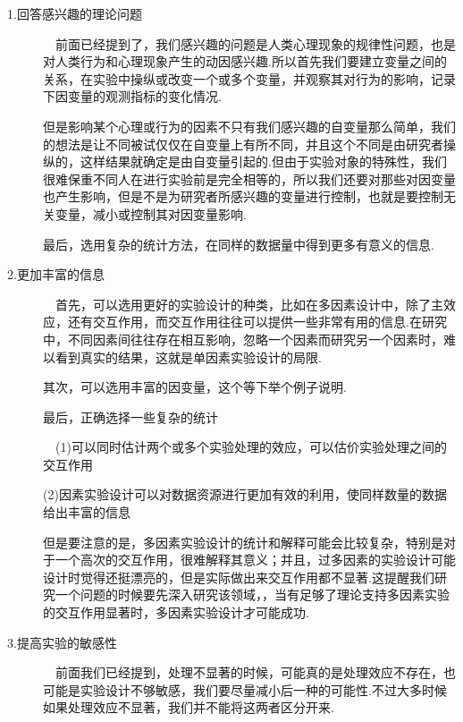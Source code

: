 \begin{description}
	\item[1.回答感兴趣的理论问题] 
	~\
	前面已经提到了，我们感兴趣的问题是人类心理现象的规律性问题，也是对人类行为和心理现象产生的动因感兴趣.所以首先我们要建立变量之间的关系，在实验中操纵或改变一个或多个变量，并观察其对行为的影响，记录下因变量的观测指标的变化情况.
	
	但是影响某个心理或行为的因素不只有我们感兴趣的自变量那么简单，我们的想法是让不同被试仅仅在自变量上有所不同，并且这个不同是由研究者操纵的，这样结果就确定是由自变量引起的.但由于实验对象的特殊性，我们很难保重不同人在进行实验前是完全相等的，所以我们还要对那些对因变量也产生影响，但是不是为研究者所感兴趣的变量进行控制，也就是要控制无关变量，减小或控制其对因变量影响.
	
	最后，选用复杂的统计方法，在同样的数据量中得到更多有意义的信息.
	
	\item[2.更加丰富的信息]
	~\
	首先，可以选用更好的实验设计的种类，比如在多因素设计中，除了主效应，还有交互作用，而交互作用往往可以提供一些非常有用的信息.在研究中，不同因素间往往存在相互影响，忽略一个因素而研究另一个因素时，难以看到真实的结果，这就是单因素实验设计的局限.
	
	其次，可以选用丰富的因变量，这个等下举个例子说明.
	
	最后，正确选择一些复杂的统计
	
	\begin{kaobox}[frametitle=多因素实验设计的优点]
		~\
		(1)可以同时估计两个或多个实验处理的效应，可以估价实验处理之间的交互作用
		
		(2)因素实验设计可以对数据资源进行更加有效的利用，使同样数量的数据给出丰富的信息
		
		但是要注意的是，多因素实验设计的统计和解释可能会比较复杂，特别是对于一个高次的交互作用，很难解释其意义；并且，过多因素的实验设计可能设计时觉得还挺漂亮的，但是实际做出来交互作用都不显著.这提醒我们研究一个问题的时候要先深入研究该领域，，当有足够了理论支持多因素实验的交互作用显著时，多因素实验设计才可能成功.
	\end{kaobox}

	\item[3.提高实验的敏感性] 
		~\
		前面我们已经提到，处理不显著的时候，可能真的是处理效应不存在，也可能是实验设计不够敏感，我们要尽量减小后一种的可能性.不过大多时候如果处理效应不显著，我们并不能将这两者区分开来.
	
\end{description}



